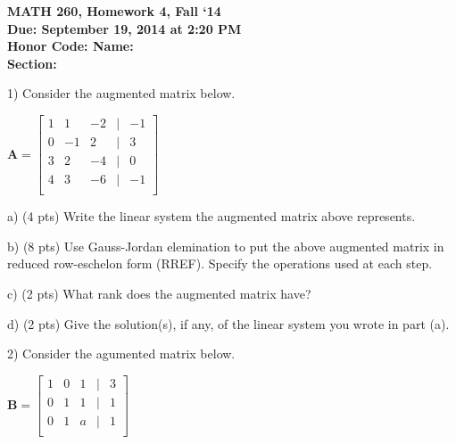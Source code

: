 \documentclass{article}
\begin{document}
\begin{flushleft}
	\bfseries{MATH 260, Homework 4, Fall `14}\\
	\bfseries{Due: September 19, 2014 at 2:20 PM}\\
	\bfseries{Honor Code:} \hspace{3.5in}\bfseries{Name:}\\
	\hspace{4.37in}\bfseries{Section:}
\end{flushleft}
\begin{flushleft}
\vspace{.25in}

1) Consider the augmented matrix below.

\vspace{0.2in}

\begin{center}
$\textbf{A}=\left[
\begin{array}{rrrcr}
1  & 1 &-2 & | &-1\\
0  &-1 & 2 & | & 3\\
3  & 2 &-4 & | & 0\\
4  & 3 &-6 & | &-1\\
\end{array}
\right]$
\end{center}

a) (4 pts) Write the linear system the augmented matrix above represents.

\vspace{1.5in}

b) (8 pts) Use Gauss-Jordan elemination to put the above augmented matrix in reduced row-eschelon form (RREF).  Specify the operations used at each step.

\pagebreak

c) (2 pts) What rank does the augmented matrix have?

\vspace{1in}

d) (2 pts) Give the solution(s), if any, of the linear system you wrote in part (a).

\vspace{1.5in}

2) Consider the agumented matrix below.

\vspace{0.2in}

\begin{center}
$\textbf{B}=\left[
\begin{array}{rrrcr}
1  & 0 & 1 & | & 3\\
0  & 1 & 1 & | & 1\\
0  & 1 & a & | & 1\\
\end{array}
\right]$
\end{center}


\end{flushleft}
\end{document}
